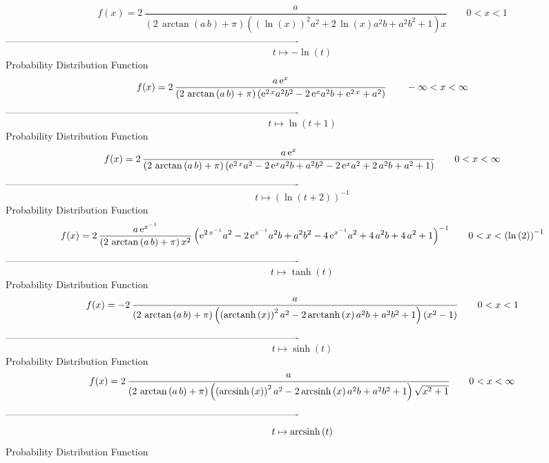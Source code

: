 \documentclass[12pt]{article}
\begin{document}
$$  f(x)=2\,{\frac {a}{ \left( 2\,\arctan \left( a\,b \right) +\pi \right) 
 \left(  \left( \ln  \left( x \right)  \right) ^{2}{a}^{2}+2\,\ln 
 \left( x \right) {a}^{2}b+{a}^{2}{b}^{2}+1 \right) x}}
 \qquad0
 < x < 1
$$-------------------------------------------------------------------------------------------  \\$$t\mapsto -\ln  \left( t \right) 
$$Probability Distribution Function 
$$  f(x)=2\,{\frac {a\,{{\rm e}^{x}}}{ \left( 2\,\arctan \left( a\,b \right) +
\pi \right)  \left( {{\rm e}^{2\,x}}{a}^{2}{b}^{2}-2\,{{\rm e}^{x}}{a}
^{2}b+{{\rm e}^{2\,x}}+{a}^{2} \right) }}
 \qquad-\infty 
 < x < \infty 
$$-------------------------------------------------------------------------------------------  \\$$t\mapsto \ln  \left( t+1 \right) 
$$Probability Distribution Function 
$$  f(x)=2\,{\frac {a\,{{\rm e}^{x}}}{ \left( 2\,\arctan \left( a\,b \right) +
\pi \right)  \left( {{\rm e}^{2\,x}}{a}^{2}-2\,{{\rm e}^{x}}{a}^{2}b+{
a}^{2}{b}^{2}-2\,{{\rm e}^{x}}{a}^{2}+2\,{a}^{2}b+{a}^{2}+1 \right) }}
 \qquad0
 < x < \infty 
$$-------------------------------------------------------------------------------------------  \\$$t\mapsto  \left( \ln  \left( t+2 \right)  \right) ^{-1}
$$Probability Distribution Function 
$$  f(x)=2\,{\frac {a\,{{\rm e}^{{x}^{-1}}}}{ \left( 2\,\arctan \left( a\,b
 \right) +\pi \right) {x}^{2}} \left( {{\rm e}^{2\,{x}^{-1}}}{a}^{2}-2
\,{{\rm e}^{{x}^{-1}}}{a}^{2}b+{a}^{2}{b}^{2}-4\,{{\rm e}^{{x}^{-1}}}{
a}^{2}+4\,{a}^{2}b+4\,{a}^{2}+1 \right) ^{-1}}
 \qquad0
 < x <  \left( \ln  \left( 2 \right)  \right) ^{-1}
$$-------------------------------------------------------------------------------------------  \\$$t\mapsto \tanh \left( t \right) 
$$Probability Distribution Function 
$$  f(x)=-2\,{\frac {a}{ \left( 2\,\arctan \left( a\,b \right) +\pi \right) 
 \left(  \left( {\rm arctanh} \left(x\right) \right) ^{2}{a}^{2}-2\,
{\rm arctanh} \left(x\right){a}^{2}b+{a}^{2}{b}^{2}+1 \right)  \left( 
{x}^{2}-1 \right) }}
 \qquad0
 < x < 1
$$-------------------------------------------------------------------------------------------  \\$$t\mapsto \sinh \left( t \right) 
$$Probability Distribution Function 
$$  f(x)=2\,{\frac {a}{ \left( 2\,\arctan \left( a\,b \right) +\pi \right) 
 \left(  \left( {\rm arcsinh} \left(x\right) \right) ^{2}{a}^{2}-2\,
{\rm arcsinh} \left(x\right){a}^{2}b+{a}^{2}{b}^{2}+1 \right) \sqrt {{
x}^{2}+1}}}
 \qquad0
 < x < \infty 
$$-------------------------------------------------------------------------------------------  \\$$t\mapsto {\rm arcsinh} \left(t\right)
$$Probability Distribution Function 
\end{document}
